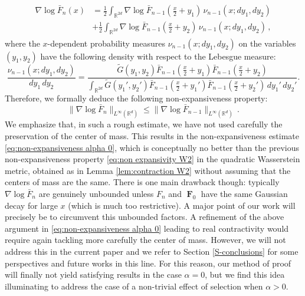 \documentclass[reqno]{amsart}
\DeclareMathOperator{\bF}{\boldsymbol{F}}
\numberwithin{equation}{section}
\begin{document}
{\begin{align}
\begin{aligned}
\nabla \log \bar F_n(x) &= \frac12 \int_{\mathbb{R}^{2d}} \nabla \log  \bar F_{n-1}\left (\frac x2 + y_1 \right )\, \nu_{n-1}(x;dy_1,dy_2)\\
&+ \frac12 \int_{\mathbb{R}^{2d}} \nabla \log  \bar F_{n-1}\left (\frac x2 + y_2 \right )\, \nu_{n-1}(x;dy_1,dy_2)\,,
\end{aligned}
\end{align}
where the $x$-dependent probability measures $\nu_{n-1}(x;dy_1,dy_2)$ on the variables $(y_1,y_2)$ have the following density with respect to the Lebesgue measure:
$$
\frac{\nu_{n-1}(x;dy_1,dy_2)}{dy_1\,dy_2} = \dfrac{\widetilde G(y_1,y_2)    \bar F_{n-1}(\frac x2 + y_1 )\bar F_{n-1}(\frac x2 + y_2)}{\int_{\mathbb{R}^{2d}} \widetilde G(y_1',y_2')   \bar F_{n-1}(\frac x2 + y_1 ')\bar F_{n-1}(\frac x2 + y_2') \,dy_1'\,dy_2'}.
$$
Therefore, we formally deduce the following non-expansiveness property:
\begin{equation}\label{eq:non-expansiveness alpha 0}
\|\nabla \log \bar F_n \|_{L^\infty(\mathbb{R}^d)} \leq \|\nabla \log \bar F_{n-1} \|_{L^\infty(\mathbb{R}^d)}\,. 
\end{equation}
We emphasize that, in such a rough estimate, we have not used carefully the preservation of the center of mass. This results in the non-expansiveness estimate \eqref{eq:non-expansiveness alpha 0}, which is conceptually no better than the previous non-expansiveness property \eqref{eq:non expansivity W2} in the quadratic Wasserstein metric, obtained as in Lemma \ref{lem:contraction W2} without assuming that the centers of mass are the same. There is one main drawback though: typically $\nabla \log \bar F_n$ are genuinely unbounded unless $F_n$ and $\bF_0$ have the same Gaussian decay for large $x$ (which is much too restrictive). A major point of our work will precisely be to circumvent this unbounded factors. A refinement of the above argument in \eqref{eq:non-expansiveness alpha 0} leading to real contractivity would require again tackling more carefully the center of mass. However, we will not address this in the current paper and we refer to Section \ref{S-conclusions} for some perspectives and future works in this line. For this reason, our method of proof will finally not yield satisfying results in the case $\alpha=0$, but we find this idea illuminating to address the case of a non-trivial effect of selection when $\alpha>0$.

\medskip

}
\end{document}
